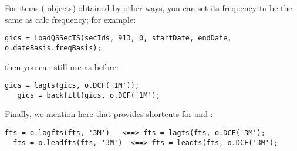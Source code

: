 \begin{parchment}
For items (\myfints{} objects) obtained by other ways,
you can set its frequency to be the same as calc frequency; for example:
\begin{lstlisting}[numbers=none]
   gics = LoadQSSecTS(secIds, 913, 0, startDate, endDate, o.dateBasis.freqBasis);
\end{lstlisting}
then you can still use  as before:
\begin{lstlisting}[numbers=none]
   gics = lagts(gics, o.DCF('1M'));
   gics = backfill(gics, o.DCF('1M');
\end{lstlisting}

Finally, we mention here that 
 provides shortcuts for  and :
\begin{lstlisting}[numbers=none]
  fts = o.lagfts(fts, '3M')   <==> fts = lagts(fts, o.DCF('3M');
  fts = o.leadfts(fts, '3M')  <==> fts = leadts(fts, o.DCF('3M');
\end{lstlisting}

\end{parchment}


